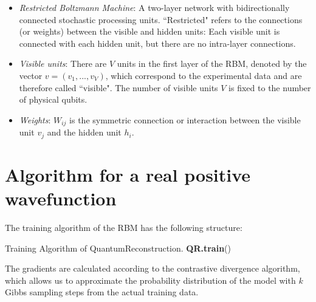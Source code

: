 \documentclass[submission, Phys]{SciPost}
\begin{document}
\begin{itemize}
	\item {\it Restricted Boltzmann Machine}: A two-layer network with bidirectionally connected stochastic processing units. ``Restricted" refers to the connections (or weights) between the visible and hidden units: Each visible unit is connected with each hidden unit, but there are no intra-layer connections.

	\item {\it Visible units}: There are $V$ units in the first layer of the RBM, denoted by the vector $v=(v_1, ..., v_V)$, which correspond to the experimental data and are therefore called ``visible". The number of visible units $V$ is fixed to the number of physical qubits.

	\item {\it Weights}: $W_{ij}$ is the symmetric connection or interaction between the visible unit $v_j$ and the hidden unit $h_i$.

\end{itemize}



	\section{Algorithm for a real positive wavefunction}
	The training algorithm of the RBM has the following structure:

	\begin{algorithm}[H]
		\caption{Training Algorithm of QuantumReconstruction. \textbf{QR.train}() }
		\SetAlgoLined

	\end{algorithm}


	The gradients are calculated according to the contrastive divergence algorithm, which allows us to approximate the probability distribution of the model with $k$ Gibbs sampling steps from the actual training data.
\end{document}
